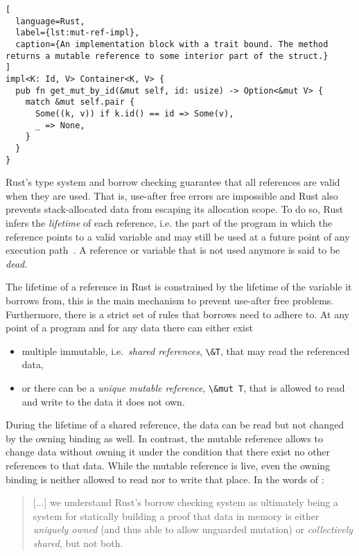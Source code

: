 \begin{lstlisting}[
  language=Rust,
  label={lst:mut-ref-impl},
  caption={An implementation block with a trait bound. The method returns a mutable reference to some interior part of the struct.}
]
impl<K: Id, V> Container<K, V> {
  pub fn get_mut_by_id(&mut self, id: usize) -> Option<&mut V> {
    match &mut self.pair {
      Some((k, v)) if k.id() == id => Some(v),
      _ => None,
    }
  }
}
\end{lstlisting}

Rust's type system and borrow checking guarantee that all references are valid
when they are used. That is, use-after free errors are impossible and Rust also
prevents stack-allocated data from escaping its allocation scope. To do so, Rust
infers the \emph{lifetime} of each reference, i.e. the part of the program in
which the reference points to a valid variable and may still be used at a future
point of any execution path~\cite{wiki:live-vars}. A reference or variable that
is not used anymore is said to be \emph{dead}.

The lifetime of a reference in Rust is constrained by the lifetime of the
variable it borrows from, this is the main  mechanism to prevent use-after free
problems. Furthermore, there is a strict set of rules that borrows need to
adhere to. At any point of a program and for any data there can either exist

\begin{itemize}
\tightlist
\item multiple immutable, i.e.~\emph{shared references}, \lstinline!\&T!,  that
may read the referenced data,

\item or there can be a \emph{unique mutable reference},
\passthrough{\lstinline!\&mut T!}, that is allowed to read and write to the data
it does not own.
\end{itemize}

During the lifetime of a shared reference, the data can be read but not changed
by the owning binding as well. In contrast, the mutable reference allows to
change data without owning it under the condition that there exist no other
references to that data. While the mutable reference is live, even the owning
binding is neither allowed to read nor to write that place. In the words of
\citet{oxide}:

\begin{quote}
{[...]} we understand Rust's borrow checking system as ultimately being a system
for statically building a proof that data in memory is either
\emph{uniquely owned} (and thus able to allow unguarded mutation) or
\emph{collectively shared}, but not both.
\end{quote}

